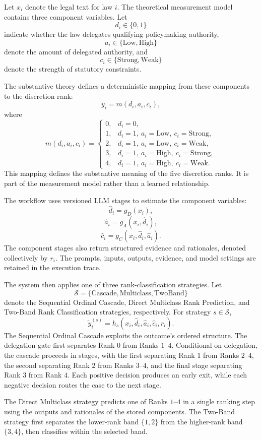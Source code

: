 \documentclass[conference]{IEEEtran}
\begin{document}
Let $x_i$ denote the legal text for law $i$. The theoretical measurement model contains three component variables. Let
\[
d_i \in \{0,1\}
\]
indicate whether the law delegates qualifying policymaking authority,
\[
a_i \in \{\mathrm{Low},\mathrm{High}\}
\]
denote the amount of delegated authority, and
\[
c_i \in \{\mathrm{Strong},\mathrm{Weak}\}
\]
denote the strength of statutory constraints.

The substantive theory defines a deterministic mapping from these components to the discretion rank:
\[
y_i = m(d_i,a_i,c_i),
\]
where
\[
m(d_i,a_i,c_i)=
\begin{cases}
0, & d_i=0,\\
1, & d_i=1,\ a_i=\mathrm{Low},\ c_i=\mathrm{Strong},\\
2, & d_i=1,\ a_i=\mathrm{Low},\ c_i=\mathrm{Weak},\\
3, & d_i=1,\ a_i=\mathrm{High},\ c_i=\mathrm{Strong},\\
4, & d_i=1,\ a_i=\mathrm{High},\ c_i=\mathrm{Weak}.
\end{cases}
\]
This mapping defines the substantive meaning of the five discretion ranks. It is part of the measurement model rather than a learned relationship.

The workflow uses versioned LLM stages to estimate the component variables:
\[
\hat d_i = g_D(x_i),
\]
\[
\hat a_i = g_A(x_i,\hat d_i),
\]
\[
\hat c_i = g_C(x_i,\hat d_i,\hat a_i).
\]
The component stages also return structured evidence and rationales, denoted collectively by $r_i$. The prompts, inputs, outputs, evidence, and model settings are retained in the execution trace.

The system then applies one of three rank-classification strategies. Let
\[
\mathcal{S} = \{\mathrm{Cascade},\mathrm{Multiclass},\mathrm{TwoBand}\}
\]
denote the Sequential Ordinal Cascade, Direct Multiclass Rank Prediction, and Two-Band Rank Classification strategies, respectively. For strategy $s \in \mathcal{S}$,
\[
\tilde y_i^{(s)} = h_s(x_i,\hat d_i,\hat a_i,\hat c_i,r_i).
\]
The Sequential Ordinal Cascade exploits the outcome's ordered structure. The delegation gate first separates Rank $0$ from Ranks $1$--$4$. Conditional on delegation, the cascade proceeds in stages, with the first separating Rank $1$ from Ranks $2$--$4$, the second separating Rank $2$ from Ranks $3$--$4$, and the final stage separating Rank $3$ from Rank $4$. Each positive decision produces an early exit, while each negative decision routes the case to the next stage.

The Direct Multiclass strategy predicts one of Ranks $1$--$4$ in a single ranking step using the outputs and rationales of the stored components. The Two-Band strategy first separates the lower-rank band $\{1,2\}$ from the higher-rank band $\{3,4\}$, then classifies within the selected band.
\end{document}
